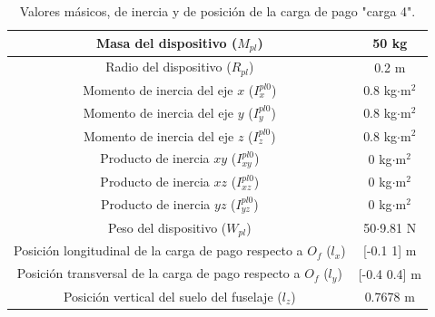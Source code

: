 \begin{table}[htbp]
	\centering
	\begin{tabular}{|>{\columncolor{Gray}}c|c|}
		\hline
		\cellcolor{Gray}Masa del dispositivo ($M_{pl}$) & 50 kg \\ \hline
		\cellcolor{Gray}Radio del dispositivo ($R_{pl}$) & 0.2 m \\ \hline
		\cellcolor{Gray}Momento de inercia del eje $x$ ($I_{x}^{pl0}$) & 0.8 kg$\cdot$m$^2$ \\ \hline
		\cellcolor{Gray}Momento de inercia del eje $y$ ($I_{y}^{pl0}$) & 0.8 kg$\cdot$m$^2$ \\ \hline
		\cellcolor{Gray}Momento de inercia del eje $z$ ($I_{z}^{pl0}$) & 0.8 kg$\cdot$m$^2$ \\ \hline
		\cellcolor{Gray}Producto de inercia $xy$ ($I_{xy}^{pl0}$)& 0 kg$\cdot$m$^2$ \\ \hline
		\cellcolor{Gray}Producto de inercia $xz$ ($I_{xz}^{pl0}$)& 0 kg$\cdot$m$^2$ \\ \hline
		\cellcolor{Gray}Producto de inercia $yz$ ($I_{yz}^{pl0}$)& 0 kg$\cdot$m$^2$ \\ \hline
		\cellcolor{Gray}Peso del dispositivo ($W_{pl}$)& 50$\cdot$9.81 N \\ \hline
		\cellcolor{Gray}Posición longitudinal de la carga de pago respecto a $O_f$ ($l_x$) & [-0.1 1] m \\ \hline
		\cellcolor{Gray}Posición transversal de la carga de pago respecto a $O_f$ ($l_y$) & [-0.4 0.4] m \\ \hline
		\cellcolor{Gray}Posición vertical del suelo del fuselaje ($l_z$) & 0.7678 m \\ \hline
	\end{tabular}%
	\caption{Valores másicos, de inercia y de posición de la carga de pago "carga 4".}
	\label{carga4}
\end{table}%

